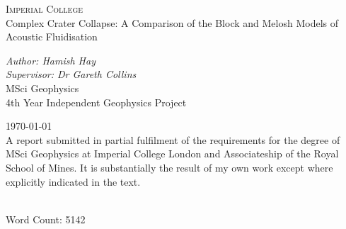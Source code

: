 
\begin{titlepage}

\noindent

\centering
\textsc{\LARGE Imperial College}\\[2cm]
{\titlefont Complex Crater Collapse: A Comparison of the Block and Melosh Models of Acoustic Fluidisation}\par

\vspace{2cm}

\large\textit{Author: Hamish Hay\\Supervisor: Dr Gareth Collins}\\[1.3cm]
\large MSci Geophysics\\
\large 4th Year Independent Geophysics Project\\
\null\vfill

\hfill

{\small \today}\\[0.7cm]

\small A report submitted in partial fulfilment of the requirements for the degree of MSci Geophysics at Imperial College London and Associateship of the Royal School of Mines. It is substantially the result of my own work except where explicitly indicated in the text. \smallskip

\\[.5cm]

\noindent \footnotesize Word Count: 5142
\end{titlepage}
